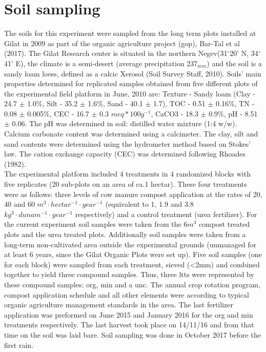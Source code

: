 


\section{Soil sampling}
The soils for this experiment were sampled from the long term plots installed at Gilat in 2009 as part of the organic agriculture project (\gls{gop}), Bar-Tal et al (2017). The Gilat Research center is situated in the northern Negev(31$^\circ$20' N, 34$^\circ$41' E), the climate is a semi-desert (average precipitation $ 237_{mm} $) and the soil is a sandy loam loess, defined as a calcic Xerosol (Soil Survey Staff, 2010). Soils' main properties determined for replicated samples obtained from five different plots of the experimental field platform in June, 2010 are: Texture - Sandy loam (Clay - 24.7 $\pm$ 1.0\%, Silt - 35.2 $ \pm $ 1.6\%, Sand - 40.1 $\pm$ 1.7), TOC - 0.51 $\pm$ 0.16\%, TN - 0.08 $\pm$ 0.005\%, CEC - 16.7 $\pm$ 0.3 $ meq *
100g^{-1} $, CaCO3 - 18.3 $\pm$ 0.9\%, pH - 8.51 $\pm$ 0.06. The pH was determined in soil: distilled water mixture (1:4 w/w). Calcium carbonate content was determined using a calcimeter. The clay, silt and sand contents were determined using the hydrometer method based on Stokes’ law. The cation exchange capacity (CEC) was determined following Rhoades (1982).\\
The experimental platform included 4 treatments in 4 randomized blocks with five replicates (20 sub-plots on an area of ca.1 hectar). These four treatments were as follows: three levels of cow manure compost application at the rates of 20, 40 and 60 $m^3\cdot hectar^{-1}\cdot year^{-1}$ (equivalent to 1, 1.9 and 3.8 $kg^3\cdot dunam^{-1}\cdot year^{-1}$ respectively) and a control treatment (urea fertilizer). For the current experiment soil samples were taken from the 6$m^3$ compost treated plots and the urea treated plots. Additionally soil samples were taken from a long-term non-cultivated area outside the experimental grounds (unmanaged for at least 6 years, since the Gilat Organic Plots were set up).  Five soil samples (one for each block) were sampled from each treatment, sieved (\textless 2mm) and combined together to yield three compound samples. Thus, three \glspl{ltt} were represented by these compound samples: \gls{org}, \gls{min} and a \gls{unc}.
The annual crop rotation program, compost application schedule and all other elements were according to typical organic agriculture management standards in the area. The last fertilizer application was preformed on June 2015 and January 2016 for the \gls{org} and \gls{min} treatments respectively. The last harvest took place on 14/11/16 and from that time on the soil was laid bare. Soil sampling was done in October 2017 before the first rain.





